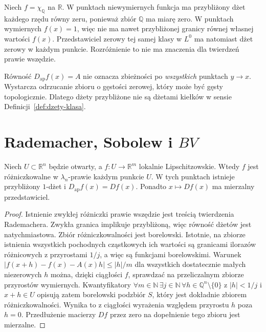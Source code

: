 \begin{przyklad}
Niech $f=\chi_{\mathbb Q}$ na $\mathbb R$. W punktach
niewymiernych funkcja ma przybliżony dżet każdego rzędu
równy zeru, ponieważ zbiór $\mathbb Q$ ma miarę zero.
W punktach wymiernych $f(x)=1$, więc nie ma nawet
przybliżonej granicy równej własnej wartości $f(x)$.
Przedstawiciel zerowy tej samej klasy w $L^0$ ma natomiast
dżet zerowy w każdym punkcie. Rozróżnienie to nie ma
znaczenia dla twierdzeń prawie wszędzie.
\end{przyklad}

\begin{uwaga}
Równość $D_{\mathrm{ap}}f(x)=A$ nie oznacza
zbieżności po \emph{wszystkich} punktach $y\to x$.
Wystarcza odrzucanie zbioru o gęstości zerowej,
który może być gęsty topologicznie. Dlatego dżety
przybliżone nie są dżetami kiełków w sensie
Definicji~\ref{def:dzety-klasa}.
\end{uwaga}

\section{Rademacher, Sobolew i $BV$}
\begin{twierdzenie}
\label{thm:dzety-rademacher}
Niech $U\subset\mathbb R^n$ będzie otwarty, a
$f:U\to\mathbb R^m$ lokalnie Lipschitzowskie.
Wtedy $f$ jest różniczkowalne w $\lambda_n$-prawie każdym
punkcie $U$. W tych punktach istnieje przybliżony
$1$-dżet i $D_{\mathrm{ap}}f(x)=Df(x)$.
Ponadto $x\mapsto Df(x)$ ma mierzalny przedstawiciel.
\end{twierdzenie}
\begin{proof}
Istnienie zwykłej różniczki prawie wszędzie jest treścią
twierdzenia Rademachera. Zwykła granica implikuje
przybliżoną, więc równość dżetów jest natychmiastowa.
Zbiór różniczkowalności jest borelowski. Istotnie,
na zbiorze istnienia wszystkich pochodnych cząstkowych
ich wartości są granicami ilorazów różnicowych z
przyrostami $1/j$, a więc są funkcjami borelowskimi.
Warunek
$|f(x+h)-f(x)-A(x)h|\le |h|/m$
dla wszystkich dostatecznie małych niezerowych $h$
można, dzięki ciągłości $f$, sprawdzać na przeliczalnym
zbiorze przyrostów wymiernych. Kwantyfikatory
$\forall m\in\mathbb N\,\exists j\in\mathbb N\,
\forall h\in\mathbb Q^n\setminus\{0\}$ z $|h|<1/j$
i $x+h\in U$ opisują zatem borelowski podzbiór $S$,
który jest dokładnie zbiorem różniczkowalności.
Wynika to z ciągłości wyrażenia względem przyrostu $h$
poza $h=0$. Przedłużenie macierzy
$Df$ przez zero na dopełnienie tego zbioru jest mierzalne.
\end{proof}

